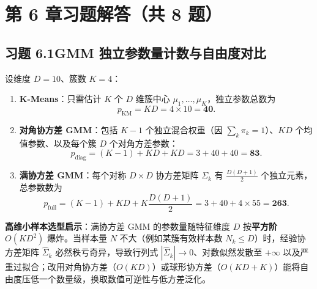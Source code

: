 \section*{第 6 章习题解答（共 8 题）}

\subsection*{习题 6.1\quad GMM 独立参数量计数与自由度对比}
设维度 $D = 10$、簇数 $K = 4$：
\begin{enumerate}[label=(\arabic*), leftmargin=1.8em]
  \item \textbf{K-Means}：只需估计 $K$ 个 $D$ 维簇中心 $\mu_1, \dots, \mu_K$，独立参数总数为
  \[
    p_{\mathrm{KM}} = K D = 4 \times 10 = \mathbf{40}.
  \]
  \item \textbf{对角协方差 GMM}：包括 $K - 1$ 个独立混合权重（因 $\sum_k \pi_k = 1$）、$KD$ 个均值参数、以及每个簇 $D$ 个对角方差参数：
  \[
    p_{\mathrm{diag}} = (K - 1) + K D + K D = 3 + 40 + 40 = \mathbf{83}.
  \]
  \item \textbf{满协方差 GMM}：每个对称 $D\times D$ 协方差矩阵 $\Sigma_k$ 有 $\frac{D(D+1)}{2}$ 个独立元素，总参数数为
  \[
    p_{\mathrm{full}} = (K - 1) + K D + K\frac{D(D+1)}{2} = 3 + 40 + 4 \times 55 = \mathbf{263}.
  \]
\end{enumerate}
\textbf{高维小样本选型启示}：满协方差 GMM 的参数量随特征维度 $D$ 按\textbf{平方阶 $O(KD^2)$} 爆炸。当样本量 $N$ 不大（例如某簇有效样本数 $N_k \le D$）时，经验协方差矩阵 $\hat{\Sigma}_k$ 必然秩亏奇异，导致行列式 $|\hat{\Sigma}_k| \to 0$、对数似然发散至 $+\infty$ 以及严重过拟合；改用对角协方差（$O(KD)$）或球形协方差（$O(KD + K)$）能将自由度压低一个数量级，换取数值可逆性与低方差泛化。

